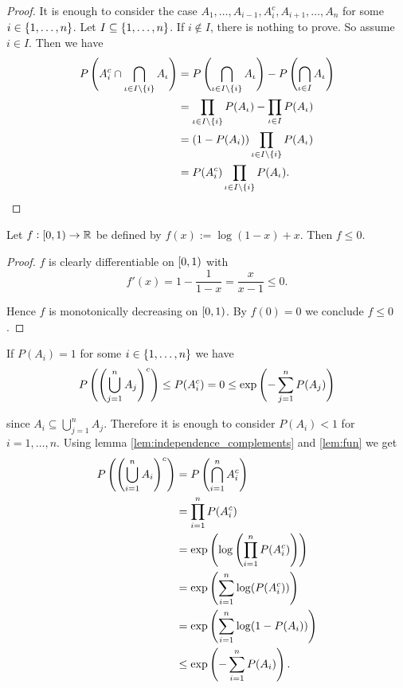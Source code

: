 \begin{enumerate}[label = \textbf{Exercise \arabic*.},wide = 0pt, itemsep=1.5ex]
\begin{enumerate}[label = \arabic*.,wide = 0pt, itemsep=1.5ex]
				\begin{proof}
					It is enough to consider the case $A_1,\dots,A_{i - 1},A_i^c,A_{i + 1},\dots,A_n$ for some $i \in \cbr[0]{1,\dots,n}$. Let $I \subseteq \cbr[0]{1,\dots,n}$. If $i \notin I$, there is nothing to prove. So assume $i \in I$. Then we have
					\begin{align*}
						P\del[4]{A_i^c \cap \bigcap_{\iota \in I \setminus \cbr[0]{i}} A_\iota} &= P\del[4]{\bigcap_{\iota \in I \setminus \cbr[0]{i}}A_\iota}- P\del[4]{\bigcap_{\iota \in I} A_\iota}\\
						&= \prod_{\iota \in I \setminus \cbr[0]{i}} P(A_\iota) - \prod_{\iota \in I} P(A_\iota)\\
						&= (1 - P(A_i))\prod_{\iota \in I \setminus \cbr[0]{i}} P(A_\iota)\\
						&= P(A_i^c) \prod_{\iota \in I \setminus \cbr[0]{i}} P(A_\iota).
					\end{align*}
				\end{proof}

				\begin{lemma}
					Let $f: \intco{0,1} \to \mathbb{R}$ be defined by $f(x) := \log(1-x)+x$. Then $f \leq 0$.
					\label{lem:fun}
				\end{lemma}

				\begin{proof}
					$f$ is clearly differentiable on $\intco{0,1}$ with
					\begin{equation}
						f'(x) = 1 - \frac{1}{1 - x} = \frac{x}{x - 1} \leq 0.
					\end{equation}

					Hence $f$ is monotonically decreasing on $\intco{0,1}$. By $f(0) = 0$ we conclude $f \leq 0$.
				\end{proof}
				If $P(A_i) = 1$ for some $i \in \cbr[0]{1,\dots,n}$ we have
				\begin{equation*}
					P\del[4]{\del[4]{\bigcup_{j = 1}^n A_j}^c} \leq P(A_i^c) = 0 \leq \exp\del[4]{-\sum_{j = 1}^n P(A_j)}
				\end{equation*}

				\noindent since $A_i \subseteq \bigcup_{j = 1}^n A_j$. Therefore it is enough to consider $P(A_i) < 1$ for $i = 1,\dots,n$. Using lemma \ref{lem:independence_complements} and \ref{lem:fun} we get
				\begin{align*}
					P\del[4]{\del[4]{\bigcup_{i = 1}^n A_i}^c} &= P\del[4]{\bigcap_{i = 1}^n A_i^c}\\
					&= \prod_{i = 1}^n P(A_i^c)\\
					&= \exp \del[4]{\log \del[4]{\prod_{i = 1}^n P(A_i^c)}}\\
					&= \exp \del[4]{\sum_{i = 1}^n \log(P(A_i^c))}\\
					&= \exp \del[4]{\sum_{i = 1}^n \log(1 - P(A_i))}\\
					&\leq \exp \del[4]{-\sum_{i = 1}^n P(A_i)}.
				\end{align*}
		\end{enumerate}
\end{enumerate}
\printbibliography

